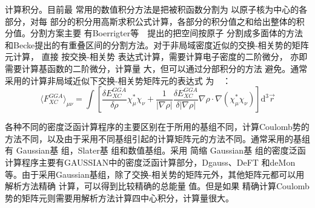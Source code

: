 {计算积分}。目前最%
{常用}的数值积分方法是把被积函数分割为%
{以原子核为}中心{的各}部分，对每%
部分的积分用高斯求积公式{计算，各部分的积分值之和给出整体的积分值。}分割方案主要%
{有}Boerrigter等~\cite{IJQC33-87_1988}~提出的把空间按原子%
分割成多面体的方法和Becke\cite{JCP88-2547_1988}提出的{有}重叠区间{的}分割方法。对于非局域密度近似的交换-相关势的矩阵元计算，%
直接%
{按}交换-相关势%
{表达式}计算，需要计算电子密度的二阶微分，%
{亦}即需要计算基函数的二阶微分，计算量%
大，但可以通过分部积分的方法%
避免{。}通常采用的计算非局域近似下交换-相关势矩阵{元}的表达式%
{为}~\cite{PRA43-5810_1991}~：
\begin{equation} 
\label{eq:dft-14}
\langle F_{XC}^{GGA}\rangle_{\mu\nu}=\int{\left[\dfrac{\delta E_{XC}^{GGA}}{\delta \rho}\chi_{\mu}^{\ast}\chi_{\nu}+\dfrac1{|\nabla\rho|}\dfrac {\delta E_{XC}^{GGA}}{\delta|\nabla\rho|}\nabla\rho\cdot\nabla(\chi_{\mu}^{\ast}\chi_{\nu})\right]\textrm{d}^3\vec r}
\end{equation}

各种不同的密度泛函计算程序的主要区别在于所用的基组不同，计算Coulomb势的方法不同，以及由于采用不同基组引起的计算矩阵元的方法不同。通常采用的基组有%
Gaussian基%
{组}，Slater基%
{组}和数值基组。采用%
{简}缩%
Gaussian基%
{组}的密度泛函计算程序主要有GAUSSIAN\cite{CPL199-557_1992}中的密度泛函计算部分，Dgauss\cite{JCP96-1280_1992}、DeFT\cite{Http-DFT} 和deMon\cite{CPL169-387_1990}等{。}由于采用Gaussian基组，除了交换-相关势的矩阵元外，其他矩阵元都可以用解析方法精确%
{计算}，可以得到比较精确的总能量%
值。但是如果%
精确计算Coulomb势的矩阵元则需要用解析方法计算四中心积分，计算量很大。

